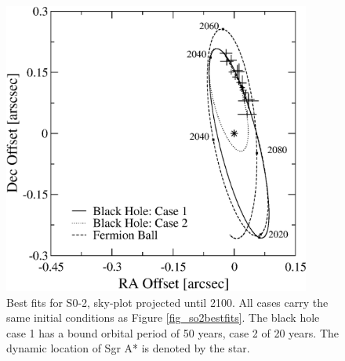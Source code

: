 \begin{figure}[!p]
	\begin{center}
	\includegraphics[width=0.9\textwidth]{eps/skyplot-so2.eps}
	\caption{Best fits for S0-2, sky-plot projected until 2100. All cases carry the same initial conditions as
	Figure \ref{fig_so2bestfits}. The black hole case 1 has a bound orbital period of 50 years, case 2 of 20 years.
	The dynamic location of Sgr A* is denoted by the star.}
	\label{fig_so2bestfitssky}
	\end{center}
\end{figure}
